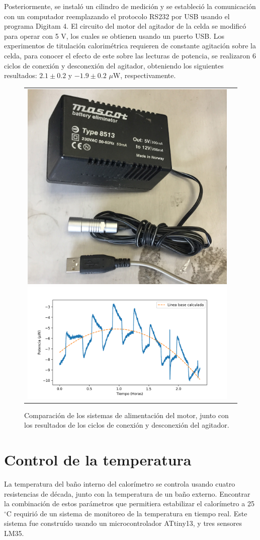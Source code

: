 \documentclass[a0]{sciposter}
\newcommand{\grad}{$^\circ$C}
\begin{document}
\begin{multicols}{3}
	Posteriormente, se instaló un cilindro de medición y se estableció la comunicación con un computador reemplazando el protocolo RS232 por USB usando el programa Digitam 4. El circuito del motor del agitador de la celda se modificó para operar con 5 V, los cuales se obtienen usando un puerto USB. Los experimentos de titulaci\'on calorim\'etrica requieren de constante agitaci\'on sobre la celda, para conocer el efecto de este sobre las lecturas de potencia, se realizaron 6 ciclos de conexi\'on y desconexi\'on del agitador, obteniendo los siguientes resultados: $2.1\pm0.2$ y $-1.9\pm0.2$ $\mu$W, respectivamente.
	\begin{figure}[h]
		\centering
		\begin{tabular}{cc}
			\includegraphics[width=0.3\linewidth]{../Tesis/Figures/motorCircuit}
			\includegraphics[width=0.7\linewidth]{../Data/Baselines/motor}
		\end{tabular}
		\caption{Comparación de los sistemas de alimentación del motor, junto con los resultados de los ciclos de conexión y desconexión del agitador.}
	\end{figure}

\section{Control de la temperatura}
	La temperatura del baño interno del calorímetro se controla usando cuatro resistencias de década, junto con la temperatura de un baño externo. Encontrar la combinación de estos parámetros que permitiera estabilizar el calorímetro a 25 \grad{} requirió de un sistema de monitoreo de la temperatura en tiempo real. Este sistema fue construído usando un microcontrolador ATtiny13, y tres sensores LM35.


\end{multicols}
\end{document}
